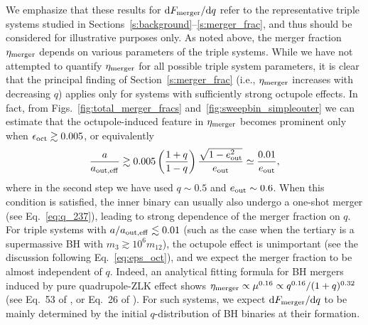 \documentclass[
        fleqn,
        usenatbib,
    ]{mnras}
\newcommand*{\md}[0]{\mathrm{d}}
\begin{document}
We emphasize that these results for $\md F_{\rm merger}/\md q$ refer to the
representative triple systems studied in
Sections~\ref{s:background}--\ref{s:merger_frac}, and thus should be considered
for illustrative purposes only. As noted above, the merger fraction $\eta_{\rm
merger}$ depends on various parameters of the triple systems. While we have not
attempted to quantify $\eta_{\rm merger}$ for all possible triple system
parameters, it is clear that the principal finding of
Section~\ref{s:merger_frac} (i.e., $\eta_{\rm merger}$ increases with decreasing
$q$) applies only for systems with sufficiently strong octupole effects. In
fact, from Figs.~\ref{fig:total_merger_fracs} and~\ref{fig:sweepbin_simpleouter}
we can estimate that the octupole-induced feature in $\eta_{\rm merger}$ becomes
prominent only when $\epsilon_{\rm oct}\gtrsim 0.005$, or equivalently
\begin{equation}
  {a\over a_{\rm out,eff}} \gtrsim
    0.005 \left({1+q\over 1-q}\right){\sqrt{1-e_{\rm out}^2}\over e_{\rm out}}
\simeq {0.01 \over e_{\rm out}},
    \label{eq:new}
\end{equation}
where in the second step we have used $q\sim 0.5$ and $e_{\rm out}\sim 0.6$.
When this condition is satisfied, the inner binary can usually also undergo a
one-shot merger (see Eq.~\ref{eq:q_237}), leading to strong dependence of the
merger fraction on $q$. For triple systems with $a/a_{\rm out,eff}\lesssim 0.01$
(such as the case when the tertiary is a supermassive BH with $m_3\gtrsim 10^6
m_{12}$), the octupole effect is unimportant (see the discussion following
Eq.~\ref{eq:eps_oct}), and we expect the merger fraction to be almost
independent of $q$. Indeed, an analytical fitting formula for BH mergers induced
by pure quadrupole-ZLK effect shows $\eta_{\rm merger}\propto \mu^{0.16} \propto
q^{0.16}/(1+q)^{0.32}$ (see Eq.~53 of \citealp{LL18}, or Eq.~26 of
\citealp{bin_misc1}). For such systems, we expect $\md F_{\rm merger}/\md q$ to
be mainly determined by the initial $q$-distribution of BH binaries at their
formation.
\end{document}
